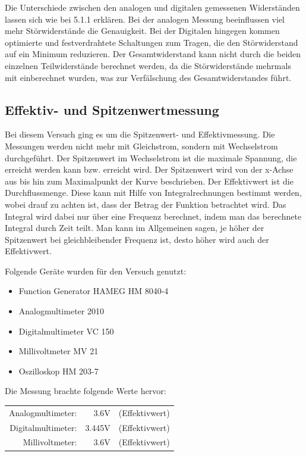 \documentclass[a4paper,11pt]{article}
\begin{document}
Die Unterschiede zwischen den analogen und digitalen gemessenen Widerständen lassen sich wie bei 5.1.1 erklären. 
Bei der analogen Messung  beeinflussen viel mehr Störwiderstände die Genauigkeit. Bei der Digitalen hingegen kommen optimierte und festverdrahtete Schaltungen zum Tragen, die den Störwiderstand auf ein Minimum reduzieren. 
Der Gesamtwiderstand kann nicht durch die beiden einzelnen Teilwiderstände berechnet werden, da die Störwiderstände mehrmals mit einberechnet wurden, was zur Verfälschung des Gesamtwiderstandes führt. 

\subsection{Effektiv- und Spitzenwertmessung}

Bei diesem Versuch ging es um die Spitzenwert- und Effektivmessung. Die Messungen werden nicht mehr mit Gleichstrom, sondern mit Wechselstrom durchgeführt. Der Spitzenwert im Wechselstrom ist die maximale Spannung, die erreicht werden kann bzw. erreicht wird. 
Der Spitzenwert wird von der x-Achse aus bis hin zum Maximalpunkt der Kurve beschrieben. 
Der Effektivwert ist die Durchflussmenge. Diese kann mit Hilfe von Integralrechnungen bestimmt werden, wobei drauf zu achten ist, dass der Betrag der Funktion betrachtet wird. Das Integral wird dabei nur über eine Frequenz berechnet, indem man das berechnete Integral durch Zeit teilt. 
Man kann im Allgemeinen sagen, je höher der Spitzenwert bei gleichbleibender Frequenz ist, desto höher wird auch der Effektivwert. 

Folgende Geräte wurden für den Versuch genutzt:
\begin{itemize}
  \item Function Generator HAMEG HM 8040-4
  \item Analogmultimeter 2010
  \item Digitalmultimeter VC 150
  \item Millivoltmeter MV 21
  \item Oszilloskop HM 203-7
\end{itemize}

Die Messung brachte folgende Werte hervor:
\begin{center}
\begin{tabular}{rrl}
  Analogmultimeter: & 3.6V & (Effektivwert) \\
  Digitalmultimeter: & 3.445V & (Effektivwert) \\
  Millivoltmeter: & 3.6V & (Effektivwert) \\
\end{tabular}
\end{center}
\end{document}
